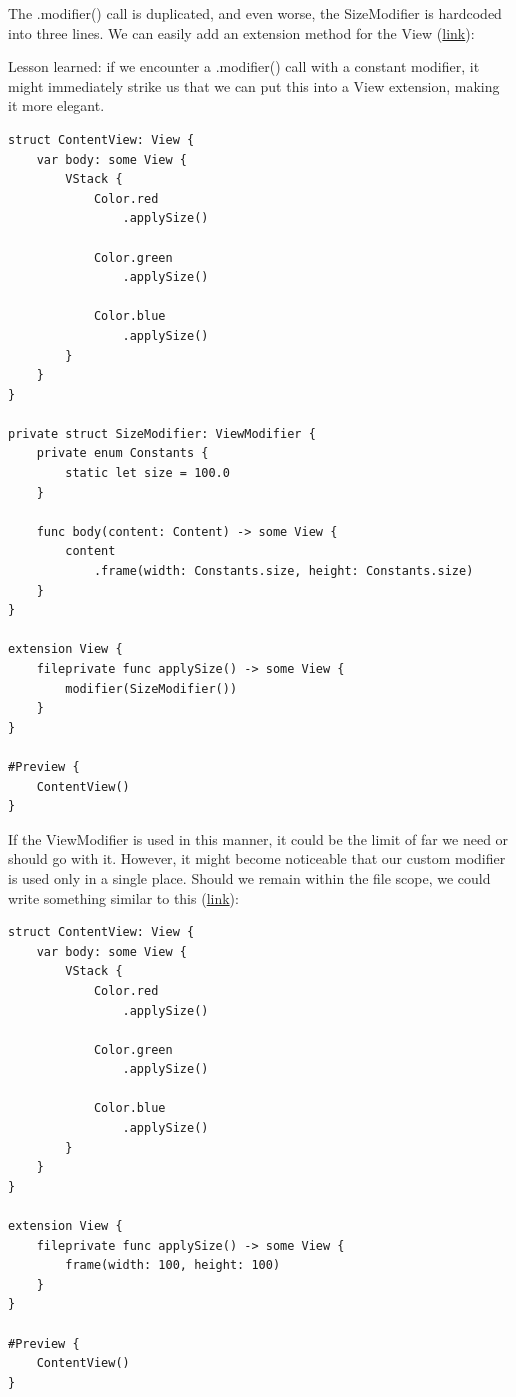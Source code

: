 \documentclass{article}
\begin{document}
The .modifier() call is duplicated, and even worse, the SizeModifier is hardcoded into three lines. We can easily add an extension method for the View (\href{https://github.com/stateman92/Medium-ViewModifier/commit/5a0c064abf6b004d865c1ec3fa354570fbf15c6d}{link}):

\begin{displayquote}
Lesson learned: if we encounter a .modifier() call with a constant modifier, it might immediately strike us that we can put this into a View extension, making it more elegant.
\end{displayquote}

\begin{lstlisting}
struct ContentView: View {
    var body: some View {
        VStack {
            Color.red
                .applySize()

            Color.green
                .applySize()

            Color.blue
                .applySize()
        }
    }
}

private struct SizeModifier: ViewModifier {
    private enum Constants {
        static let size = 100.0
    }

    func body(content: Content) -> some View {
        content
            .frame(width: Constants.size, height: Constants.size)
    }
}

extension View {
    fileprivate func applySize() -> some View {
        modifier(SizeModifier())
    }
}

#Preview {
    ContentView()
}
\end{lstlisting}

If the ViewModifier is used in this manner, it could be the limit of far we need or should go with it. However, it might become noticeable that our custom modifier is used only in a single place. Should we remain within the file scope, we could write something similar to this (\href{https://github.com/stateman92/Medium-ViewModifier/commit/b1a30d19fdeb034de8e362c9feb5fd18454a4565}{link}):

\begin{lstlisting}
struct ContentView: View {
    var body: some View {
        VStack {
            Color.red
                .applySize()

            Color.green
                .applySize()

            Color.blue
                .applySize()
        }
    }
}

extension View {
    fileprivate func applySize() -> some View {
        frame(width: 100, height: 100)
    }
}

#Preview {
    ContentView()
}
\end{lstlisting}
\end{document}
